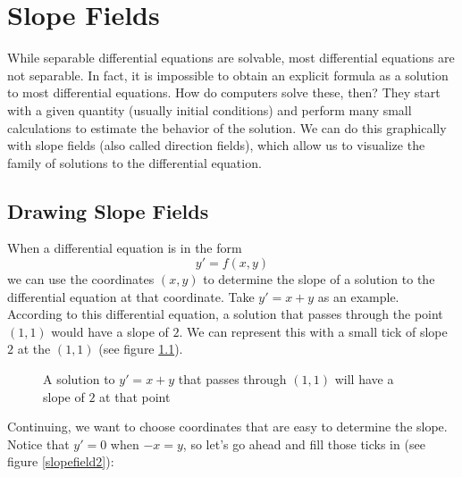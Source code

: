 \chapter{Slope Fields}

While separable differential equations are solvable, most differential 
equations are not separable. In fact, it is impossible to obtain an 
explicit formula as a solution to most differential equations. How do computers 
solve these, then? They start with a given quantity (usually initial 
conditions) and perform many small calculations to estimate the behavior of 
the solution. We can do this graphically with slope fields (also called 
direction fields), which allow us to visualize the family of solutions to the 
differential equation. 

\section{Drawing Slope Fields}
When a differential equation is in the form
$$y' = f(x,y)$$
we can use the coordinates $(x,y)$ to determine the slope of a solution to the 
differential equation at that coordinate. Take $y' = x + y$ as an example. 
According to this differential equation, a solution that passes through the 
point $(1, 1)$ would have a slope of $2$. We can represent this with a small 
tick of slope $2$ at the $(1, 1)$ (see figure \ref{slopefield1}). 

\begin{figure}[htbp]
\centering
    \caption{A solution to $y' = x + y$ that passes through $(1,1)$ will have 
    a slope of $2$ at that point}
    \label{slopefield1}
\end{figure}

Continuing, we want to choose coordinates that are easy to determine the slope. 
Notice that $y' = 0$ when $-x = y$, so let's go ahead and fill those ticks in 
(see figure \ref{slopefield2}):

